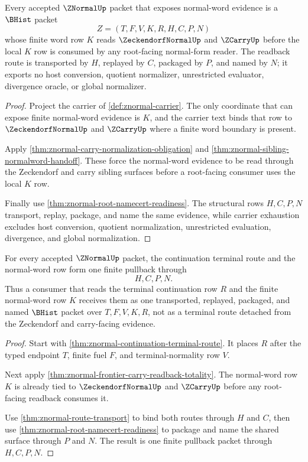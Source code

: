 \begin{theorem}
\label{thm:znormal-frontier-carry-readback-totality}
Every accepted $\ZNormalUp$ packet that exposes normal-word evidence is a $\BHist$ packet
$$
Z=(T,F,V,K,R,H,C,P,N)
$$
whose finite word row $K$ reads $\ZeckendorfNormalUp$ and $\ZCarryUp$ before the local $K$ row is consumed by any root-facing normal-form reader. The readback route is transported by $H$, replayed by $C$, packaged by $P$, and named by $N$; it exports no host conversion, quotient normalizer, unrestricted evaluator, divergence oracle, or global normalizer.
\end{theorem}
\begin{proof}
Project the carrier of \autoref{def:znormal-carrier}. The only coordinate that can expose finite normal-word evidence is $K$, and the carrier text binds that row to $\ZeckendorfNormalUp$ and $\ZCarryUp$ where a finite word boundary is present.

Apply \autoref{thm:znormal-carry-normalization-obligation} and \autoref{thm:znormal-sibling-normalword-handoff}. These force the normal-word evidence to be read through the Zeckendorf and carry sibling surfaces before a root-facing consumer uses the local $K$ row.

Finally use \autoref{thm:znormal-root-namecert-readiness}. The structural rows $H,C,P,N$ transport, replay, package, and name the same evidence, while carrier exhaustion excludes host conversion, quotient normalization, unrestricted evaluation, divergence, and global normalization.
\end{proof}

\begin{theorem}
\label{thm:znormal-continuation-normal-word-pullback}
For every accepted $\ZNormalUp$ packet, the continuation terminal route and the normal-word row form one finite pullback through
$$
H,C,P,N.
$$
Thus a consumer that reads the terminal continuation row $R$ and the finite normal-word row $K$ receives them as one transported, replayed, packaged, and named $\BHist$ packet over $T,F,V,K,R$, not as a terminal route detached from the Zeckendorf and carry-facing evidence.
\end{theorem}
\begin{proof}
Start with \autoref{thm:znormal-continuation-terminal-route}. It places $R$ after the typed endpoint $T$, finite fuel $F$, and terminal-normality row $V$.

Next apply \autoref{thm:znormal-frontier-carry-readback-totality}. The normal-word row $K$ is already tied to $\ZeckendorfNormalUp$ and $\ZCarryUp$ before any root-facing readback consumes it.

Use \autoref{thm:znormal-route-transport} to bind both routes through $H$ and $C$, then use \autoref{thm:znormal-root-namecert-readiness} to package and name the shared surface through $P$ and $N$. The result is one finite pullback packet through $H,C,P,N$.
\end{proof}

